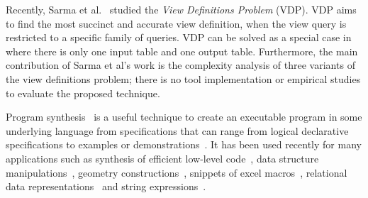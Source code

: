 Recently, Sarma et al.~\cite{DasSarma:2010} studied the \textit{View Definitions Problem} (VDP).
VDP aims to find the most
succinct and accurate view definition, when
the view query is restricted to a specific family of queries.
VDP can be solved as a special case in \ourtool where there is only one
input table and one output table. Furthermore, the main contribution
of Sarma et al's work is the complexity analysis of
three variants of the view definitions problem; there is no
tool implementation or empirical studies to evaluate
the proposed technique.






\vspace{1mm}

Program synthesis~\cite{Gulwani:2010:DPS} is a useful
technique to create an executable program
in some underlying language from specifications that can range
from logical declarative specifications to examples or
demonstrations~\cite{Harris:2011, singh:2012, Gulwani:2011,
Kandel:2011, Fisher08Pads,Lau:2003:PDU, Lau:2000:VSA, Barbosa:2010:MLA, Arasu:2009:LST}.
It has been used recently for many applications
such as synthesis of efficient low-level code~\cite{Solar-Lezama:2005},
data structure manipulations~\cite{Fisher:2008},
geometry constructions~\cite{Gulwani:2011:SGC},
snippets of excel macros~\cite{Harris:2011},
relational data representations~\cite{Barbosa:2010:MLA, Arasu:2009:LST} and string
expressions~\cite{singh:2012, Gulwani:2011}.


